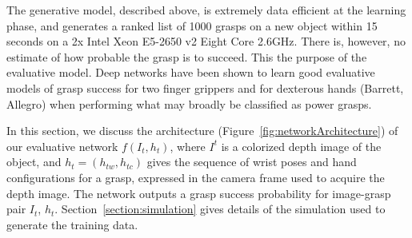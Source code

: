 
The generative model, described above, is extremely data efficient at the learning phase, and generates a ranked list of 1000 grasps on a new object within 15 seconds on a 2x Intel Xeon E5-2650 v2 Eight Core 2.6GHz. There is, however, no estimate of how probable the grasp is to succeed. This the purpose of the evaluative model. Deep networks have been shown to learn good evaluative models of grasp success for two finger grippers and for dexterous hands (Barrett, Allegro) when performing what may broadly be classified as power grasps.  

In this section, we discuss the architecture (Figure~\ref{fig:networkArchitecture}) of our evaluative network $f(I_t, h_t)$, where $I^t$ is a colorized depth image of the object, and $h_t = (h_{tw}, h_{tc})$ gives the sequence of wrist poses and hand configurations for a grasp, expressed in the camera frame used to acquire the depth image. The network outputs a grasp success probability for image-grasp pair $I_t$, $h_t$. Section~\ref{section:simulation} gives details of the simulation used to generate the training data.

